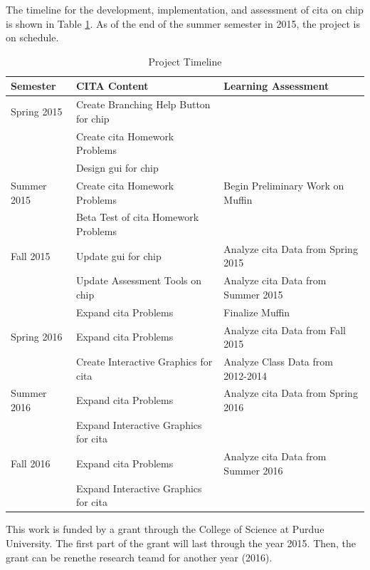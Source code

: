The timeline for the development, implementation, and assessment of \gls{cita} on \gls{chip} is shown in Table \ref{tab:timeline}. As of the end of the summer semester in 2015, the project is on schedule.

\pagebreak

\begin{landscape}
\begin{table}[!ht]
  \centering
  \begin{tabular}{|l|l|l|}
    \hline
    \textbf{Semester} & \textbf{CITA Content} & \textbf{Learning Assessment}\\
	\hline
	Spring 2015 & Create Branching Help Button for \gls{chip} & \\
	& Create \gls{cita} Homework Problems & \\
	& Design \gls{gui} for \gls{chip} & \\
	\hline
	Summer 2015 & Create \gls{cita} Homework Problems & Begin Preliminary Work on Muffin\\
	& Beta Test of \gls{cita} Homework Problems &  \\
	\hline
	Fall 2015 & Update \gls{gui} for \gls{chip} & Analyze \gls{cita} Data from Spring 2015 \\
	& Update Assessment Tools on \gls{chip} & Analyze \gls{cita} Data from Summer 2015 \\
	& Expand \gls{cita} Problems & Finalize Muffin \\
	\hline
	Spring 2016 & Expand \gls{cita} Problems & Analyze \gls{cita} Data from Fall 2015 \\
	& Create Interactive Graphics for \gls{cita} & Analyze Class Data from 2012-2014 \\
	\hline
	Summer 2016 & Expand \gls{cita} Problems & Analyze \gls{cita} Data from Spring 2016 \\
	& Expand Interactive Graphics for \gls{cita} & \\
	\hline
	Fall 2016 & Expand \gls{cita} Problems & Analyze \gls{cita} Data from Summer 2016 \\
	& Expand Interactive Graphics for \gls{cita} & \\
	\hline
  \end{tabular}
  \caption{Project Timeline}
  \label{tab:timeline}
\end{table}
\end{landscape}

\pagebreak

This work is funded by a grant through the College of Science at Purdue University. The first part of the grant will last through the year 2015. Then, the grant can be renethe research teamd for another year (2016).